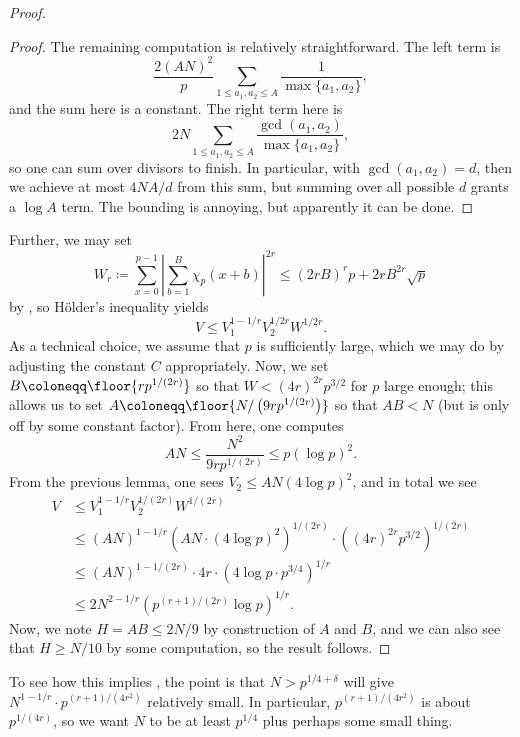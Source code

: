 \documentclass[../notes.tex]{subfiles}
\begin{document}
\begin{proof}
\begin{proof}
		The remaining computation is relatively straightforward. The left term is
		\[\frac{2(AN)^2}p\sum_{1\le a_1,a_2\le A}\frac1{\max\{a_1,a_2\}},\]
		and the sum here is a constant. The right term here is
		\[2N\sum_{1\le a_1,a_2\le A}\frac{\gcd(a_1,a_2)}{\max\{a_1,a_2\}},\]
		so one can sum over divisors to finish. In particular, with $\gcd(a_1,a_2)=d$, then we achieve at most $4NA/d$ from this sum, but summing over all possible $d$ grants a $\log A$ term. The bounding is annoying, but apparently it can be done.
	\end{proof}
	Further, we may set
	\[W_r\coloneqq\sum_{x=0}^{p-1}\left|\sum_{b=1}^B\chi_p(x+b)\right|^{2r}\le(2rB)^rp+2rB^{2r}\sqrt p\]
	by , so H\"older's inequality yields
	\[V\le V_1^{1-1/r}V_2^{1/2r}W^{1/2r}.\]
	As a technical choice, we assume that $p$ is sufficiently large, which we may do by adjusting the constant $C$ appropriately. Now, we set $B\coloneqq\floor{rp^{1/(2r)}}$ so that $W<(4r)^{2r}p^{3/2}$ for $p$ large enough; this allows us to set $A\coloneqq\floor{N/\left(9rp^{1/(2r)}\right)}$ so that $AB<N$ (but is only off by some constant factor). From here, one computes
	\[AN\le\frac{N^2}{9rp^{1/(2r)}}\le p(\log p)^2.\]
	From the previous lemma, one sees $V_2\le AN(4\log p)^2$, and in total we see
	\begin{align*}
		V&\le V_1^{1-1/r}V_2^{1/(2r)}W^{1/(2r)} \\
		&\le (AN)^{1-1/r}\left(AN\cdot(4\log p)^2\right)^{1/(2r)}\cdot\left((4r)^{2r}p^{3/2}\right)^{1/(2r)} \\
		&\le (AN)^{1-1/(2r)}\cdot4r\cdot\left(4\log p\cdot p^{3/4}\right)^{1/r} \\
		&\le 2N^{2-1/r}\left(p^{(r+1)/(2r)}\log p\right)^{1/r}.
	\end{align*}
	Now, we note $H=AB\le2N/9$ by construction of $A$ and $B$, and we can also see that $H\ge N/10$ by some computation, so the result follows.
\end{proof}
\begin{remark}
	To see how this implies , the point is that $N>p^{1/4+\delta}$ will give $N^{1-1/r}\cdot p^{(r+1)/\left(4r^2\right)}$ relatively small. In particular, $p^{(r+1)/\left(4r^2\right)}$ is about $p^{1/(4r)}$, so we want $N$ to be at least $p^{1/4}$ plus perhaps some small thing.
\end{remark}
\end{document}
